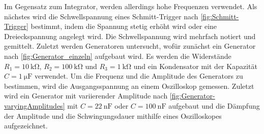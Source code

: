 Im Gegensatz zum Integrator, werden allerdings hohe Frequenzen verwendet. \newline
Als nächstes wird die Schwellspannung eines Schmitt-Trigger nach \autoref{fig:Schmitt-Trigger} bestimmt, indem die Spannung stetig erhöht wird oder eine Dreieckspannung angelegt wird.
Die Schwellspannung wird mehrfach notiert und gemittelt. \newline
Zuletzt werden Generatoren untersucht, wofür zunächst ein Generator nach \autoref{fig:Generator_einzeln} aufgebaut wird.
Es werden die Widerstände $R_1=\SI{10}{\kilo\ohm}$, $R_2=\SI{100}{\kilo\ohm}$ und $R_3=\SI{1}{\kilo\ohm}$ und ein Kondensator mit der Kapazität $C=\SI{1}{\micro\farad}$ verwendet.
Um die Frequenz und die Amplitude des Generators zu bestimmen, wird die Ausgangsspannung an einem Oszilloskop gemessen. \newline
Zuletzt wird ein Generator mit variierender Amplitude nach \autoref{fig:Generator-varyingAmplitudes} mit $C=\SI{22}{\nano\farad}$ oder $C=\SI{100}{\nano\farad}$ aufgebaut und die Dämpfung der Amplitude und die Schwingungsdauer mithilfe eines Oszilloskopes aufgezeichnet.